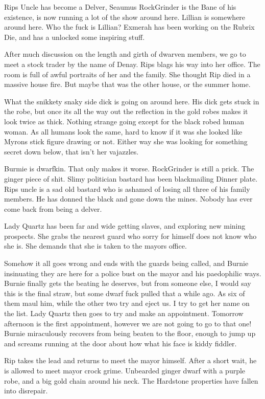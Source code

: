 \begin{multicols}{2}
Rips Uncle has become a Delver, Seaumus RockGrinder is the Bane of his existence, is now running a lot of the show around here. Lillian is somewhere around here. Who the fuck is Lillian? Exmerah has been working on the Rubrix Die, and has a unlocked some inspiring stuff.\medskip

After much discussion on the length and girth of dwarven members, we go to meet a stock trader by the name of Denay. Rips blags his way into her office. The room is full of awful portraits of her and the family. She thought Rip died in a massive house fire. But maybe that was the other house, or the summer home.\medskip

What the snikkety snaky side dick is going on around here. His dick gets stuck in the robe, but once its all the way out the reflection in the gold robes makes it look twice as thick. Nothing strange going except for the black robed human woman. As all humans look the same, hard to know if it was she looked like Myrons stick figure drawing or not. Either way she was looking for something secret down below, that isn’t her vajazzles.\medskip

Burmie is dwarfkin. That only makes it worse. RockGrinder is still a prick. The ginger piece of shit. Slimy politician bastard has been blackmailing Dinner plate. Rips uncle is a sad old bastard who is ashamed of losing all three of his family members. He has donned the black and gone down the mines. Nobody has ever come back from being a delver.\medskip

Lady Quartz has been far and wide getting slaves, and exploring new mining prospects. She grabs the nearest guard who sorry for himself does not know who she is. She demands that she is taken to the mayors office.\medskip

Somehow it all goes wrong and ends with the guards being called, and Burnie insinuating they are here for a police bust on the mayor and his paedophilic ways. Burnie finally gets the beating he deserves, but from someone else, I would say this is the final straw, but some dwarf fuck pulled that a while ago. As six of them maul him, while the other two try and eject us. I try to get her name on the list. Lady Quartz then goes to try and make an appointment. Tomorrow afternoon is the first appointment, however we are not going to go to that one! Burnie miraculously recovers from being beaten to the floor, enough to jump up and screams running at the door about how what his face is kiddy fiddler.\medskip

Rip takes the lead and returns to meet the mayor himself. After a short wait, he is allowed to meet mayor crock grime. Unbearded ginger dwarf with a purple robe, and a big gold chain around his neck. The Hardstone properties have fallen into disrepair.\medskip


\end{multicols}
